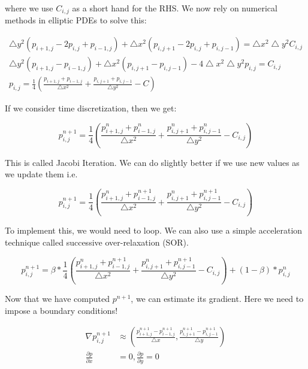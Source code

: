 \documentclass[12pt]{article}
\begin{document}
where we use $C_{i,j}$ as a short hand for the RHS. We now rely on numerical methods in elliptic PDEs to solve this:

\begin{align}
    \bigtriangleup y^2 (p_{i+1,j}-2p_{i,j}+p_{i-1,j}) + \bigtriangleup x^2 (p_{i,j+1}-2p_{i,j}+p_{i,j-1}) = \bigtriangleup x^2 \bigtriangleup y^2 C_{i,j} \\
    \bigtriangleup y^2 (p_{i+1,j} - p_{i-1,j}) + \bigtriangleup x^2 (p_{i,j+1} - p_{i,j-1}) - 4\bigtriangleup x^2 \bigtriangleup y^2 p_{i,j} = C_{i,j} \\
    p_{i,j} = \frac{1}{4}(\frac{p_{i+1,j} + p_{i-1,j}}{\bigtriangleup x^2} + \frac{p_{i,j+1} + p_{i,j-1}}{\bigtriangleup y^2} - C)
\end{align}

If we consider time discretization, then we get:

\begin{equation}
    p_{i,j}^{n+1} = \frac{1}{4}(\frac{p_{i+1,j}^n + p_{i-1,j}^n}{\bigtriangleup x^2} + \frac{p_{i,j+1}^n + p_{i,j-1}^n}{\bigtriangleup y^2} - C_{i,j})
\end{equation}

This is called Jacobi Iteration. We can do slightly better if we use new values as we update them i.e.

\begin{equation}
    p_{i,j}^{n+1} = \frac{1}{4}(\frac{p_{i+1,j}^n + p_{i-1,j}^{n+1}}{\bigtriangleup x^2} + \frac{p_{i,j+1}^n + p_{i,j-1}^{n+1}}{\bigtriangleup y^2} - C_{i,j})
\end{equation}

To implement this, we would need to loop. We can also use a simple acceleration technique called successive over-relaxation (SOR).

\begin{equation}
    p_{i,j}^{n+1} = \beta * \frac{1}{4}(\frac{p_{i+1,j}^n + p_{i-1,j}^{n+1}}{\bigtriangleup x^2} + \frac{p_{i,j+1}^n + p_{i,j-1}^{n+1}}{\bigtriangleup y^2} - C_{i,j}) + (1-\beta) * p_{i,j}^{n}
\end{equation}

Now that we have computed $p^{n+1}$, we can estimate its gradient. Here we need to impose a boundary conditions!

\begin{align*}
    \nabla p^{n+1}_{i,j} &\approx (\frac{p^{n+1}_{i+1,j} - p^{n+1}_{i-1,j}}{\bigtriangleup x}, \frac{p^{n+1}_{i,j+1} - p^{n+1}_{i,j-1}}{\bigtriangleup y}) \\
    \frac{\partial p}{\partial x} &= 0,
    \frac{\partial p}{\partial y} = 0
\end{align*}
\end{document}

